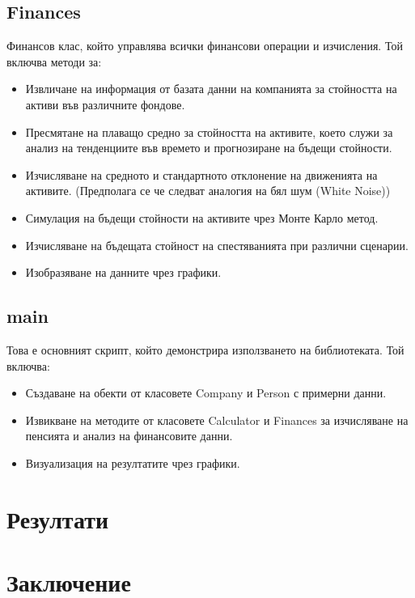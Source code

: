 \documentclass[a4paper,12pt]{article}
\begin{document}
\subsection{Finances}
Финансов клас, който управлява всички финансови операции и изчисления. Той включва методи за:
\begin{itemize}
        \item Извличане на информация от базата данни на компанията за стойността на активи във различните фондове.
        \item Пресмятане на плаващо средно за стойността на активите, което служи за анализ на тенденциите във времето и прогнозиране на бъдещи стойности.
        \item Изчисляване на средното и стандартното отклонение на движенията на активите. (Предполага се че следват аналогия на бял шум (White Noise))
        \item Симулация на бъдещи стойности на активите чрез Монте Карло метод.
        \item Изчисляване на бъдещата стойност на спестяванията при различни сценарии.
        \item Изобразяване на данните чрез графики.
\end{itemize}
\subsection{main}
Това е основният скрипт, който демонстрира използването на библиотеката. Той включва:
\begin{itemize}
        \item Създаване на обекти от класовете Company и Person с примерни данни.
        \item Извикване на методите от класовете Calculator и Finances за изчисляване на пенсията и анализ на финансовите данни.
        \item Визуализация на резултатите чрез графики.
\end{itemize}
\newpage

\section{Резултати}


\newpage
\section{Заключение}
\end{document}
